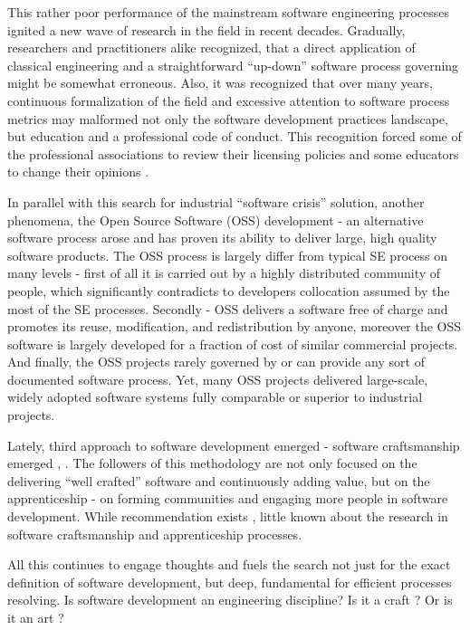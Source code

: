 This rather poor performance of the mainstream software engineering processes 
ignited a new wave of research in the field in recent decades. Gradually, researchers and 
practitioners alike recognized, that a direct application of classical engineering and a 
straightforward ``up-down'' software process governing might be somewhat erroneous. 
Also, it was recognized that over many years, continuous formalization of the field and 
excessive attention to software process metrics may malformed not only the software development 
practices landscape, but education and a professional code of conduct. 
This recognition forced some of the professional associations 
to review their licensing policies \cite{citeulike:11045517} and some educators to change their 
opinions \cite{citeulike:5203446}. 

In parallel with this search for industrial ``software crisis'' solution, another phenomena, 
the Open Source Software (OSS) 
development - an alternative software process arose and has proven its ability to deliver 
large, high quality software products. The OSS process is largely differ from typical SE process
on many levels - first of all it is carried out by a highly distributed community of people,
which significantly contradicts to developers collocation assumed by the most of the SE processes.
Secondly - OSS delivers a software free of charge and promotes its reuse, modification, and 
redistribution by anyone, moreover the OSS software is largely developed for a fraction of cost
of similar commercial projects. And finally, the OSS projects rarely governed by or can provide
any sort of documented software process. Yet, many OSS projects delivered large-scale, widely
adopted software systems fully comparable or superior to industrial projects.

Lately, third approach to software development emerged - software craftsmanship emerged 
\cite{citeulike:11058561}, \cite{citeulike:11058554}. The followers of this methodology 
are not only focused on the delivering ``well crafted'' software and continuously adding value,
but on the apprenticeship - on forming communities and engaging more people in software development.
While recommendation exists \cite{citeulike:11058784}, little known about the research 
in software craftsmanship and apprenticeship processes.

All this continues to engage thoughts and fuels the search not just for the exact definition 
of software development, but deep, fundamental for efficient processes resolving. 
Is software development an engineering discipline? Is it a craft \cite{citeulike:5203446}? 
Or is it an art \cite{citeulike:11045694}?

